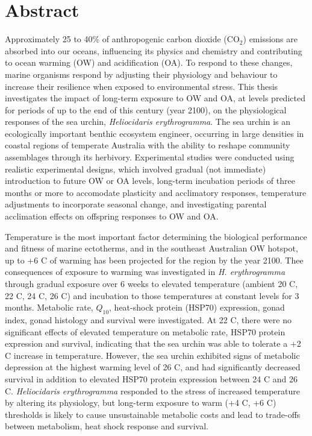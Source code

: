 \OnehalfSpacing

\chapter*{Abstract}

Approximately 25 to 40\% of anthropogenic carbon dioxide ($\mathrm{CO_2}$) emissions are absorbed into our oceans, influencing its physics and chemistry and contributing to ocean warming (OW) and acidification (OA).
To respond to these changes, marine organisms respond by adjusting their physiology and behaviour to increase their resilience when exposed to environmental stress.
This thesis investigates the impact of long-term exposure to OW and OA, at levels predicted for periods of up to the end of this century (year 2100), on the physiological responses of the sea urchin, \textit{Heliocidaris erythrogramma}. 
The sea urchin is an ecologically important benthic ecosystem engineer, occurring in large densities in coastal regions of temperate Australia with the ability to reshape community assemblages through its herbivory.
Experimental studies were conducted using realistic experimental designs, which involved gradual (not immediate) introduction to future OW or OA levels, long-term incubation periods of three months or more to accomodate plasticity and acclimatory responses, temperature adjustments to incorporate seasonal change,
and investigating parental acclimation effects on offspring responses to OW and OA. 

Temperature is the most important factor determining the biological performance and fitness of marine ectotherms, and in the southeast Australian OW hotspot, up to +6 \degree C of warming has been projected for the region by the year 2100. Thee consequences of exposure to warming was investigated in \textit{H. erythrogramma} through gradual exposure over 6 weeks to elevated temperature (ambient 20 \degree C, 22 \degree C, 24 \degree C, 26 \degree C) and incubation to those temperatures at constant levels for 3 months. 
Metabolic rate, $Q_{10}$, heat-shock protein (HSP70) expression, gonad index, gonad histology and survival were investigated. 
At 22 \degree C, there were no significant effects of elevated temperature on metabolic rate, HSP70 protein expression and survival, indicating that the sea urchin was able to tolerate a +2 \degree C increase in temperature.
However, the sea urchin exhibited signs of metabolic depression at the highest warming level of 26 \degree C, and had significantly decreased survival in addition to elevated HSP70 protein expression between 24 \degree C and 26 \degree C.
\textit{Heliocidaris erythrogramma} responded to the stress of increased temperature by altering its physiology, but long-term exposure to warm (+4 \degree C, +6 \degree C) thresholds is likely to cause unsustainable metabolic costs and lead to trade-offs between metabolism, heat shock response and survival. 

